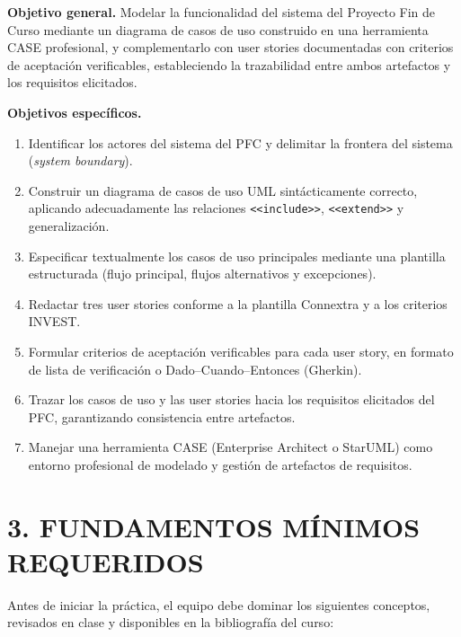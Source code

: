 \documentclass[11pt]{article}
\begin{document}
\begin{tcolorbox}[colback=boxgray,colframe=utegreen,boxrule=0.8pt,arc=2mm]
\textbf{Objetivo general.} Modelar la funcionalidad del sistema del Proyecto Fin de Curso mediante un diagrama de casos de uso construido en una herramienta CASE profesional, y complementarlo con user stories documentadas con criterios de aceptación verificables, estableciendo la trazabilidad entre ambos artefactos y los requisitos elicitados.

\medskip
\textbf{Objetivos específicos.}
\begin{enumerate}[leftmargin=18pt,itemsep=2pt]
  \item Identificar los actores del sistema del PFC y delimitar la frontera del sistema (\textit{system boundary}).
  \item Construir un diagrama de casos de uso UML sintácticamente correcto, aplicando adecuadamente las relaciones \texttt{<<include>>}, \texttt{<<extend>>} y generalización.
  \item Especificar textualmente los casos de uso principales mediante una plantilla estructurada (flujo principal, flujos alternativos y excepciones).
  \item Redactar tres user stories conforme a la plantilla Connextra y a los criterios INVEST.
  \item Formular criterios de aceptación verificables para cada user story, en formato de lista de verificación o Dado--Cuando--Entonces (Gherkin).
  \item Trazar los casos de uso y las user stories hacia los requisitos elicitados del PFC, garantizando consistencia entre artefactos.
  \item Manejar una herramienta CASE (Enterprise Architect o StarUML) como entorno profesional de modelado y gestión de artefactos de requisitos.
\end{enumerate}
\end{tcolorbox}

\section*{\textcolor{utegreendk}{3. FUNDAMENTOS MÍNIMOS REQUERIDOS}}

Antes de iniciar la práctica, el equipo debe dominar los siguientes conceptos, revisados en clase y disponibles en la bibliografía del curso:
\end{document}
